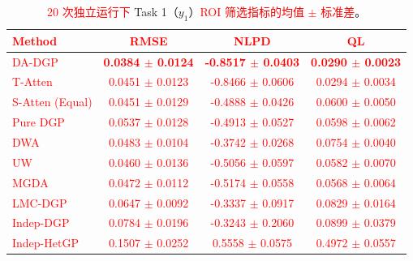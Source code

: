 \documentclass[11pt]{article}
\begin{document}
\begin{table}[htbp]
	\centering
	\small
	\caption{\textcolor{red}{Mean $\pm$ std} of \textcolor{red}{ROI-filtered metrics} for Task 1 ($y_1$) \textcolor{red}{over 20 independent runs}.}
	\caption*{\textcolor{red}{20 次独立运行下} Task 1（$y_1$）\textcolor{red}{ROI 筛选指标的均值 $\pm$ 标准差}。}
	\label{tab:results_task1}
	\begin{tabular*}{\textwidth}{@{\extracolsep{\fill}}lccc}
		\toprule
		\textbf{\textcolor{red}{Method}} & \textbf{\textcolor{red}{RMSE}} & \textbf{\textcolor{red}{NLPD}} & \textbf{\textcolor{red}{QL}} \\
		\midrule
		\textcolor{red}{DA-DGP} & \textcolor{red}{\textbf{0.0384 $\pm$ 0.0124}} & \textcolor{red}{\textbf{-0.8517 $\pm$ 0.0403}} & \textcolor{red}{\textbf{0.0290 $\pm$ 0.0023}} \\
		\textcolor{red}{T-Atten} & \textcolor{red}{0.0451 $\pm$ 0.0123} & \textcolor{red}{-0.8466 $\pm$ 0.0606} & \textcolor{red}{0.0294 $\pm$ 0.0034} \\
		\textcolor{red}{S-Atten (Equal)} & \textcolor{red}{0.0451 $\pm$ 0.0129} & \textcolor{red}{-0.4888 $\pm$ 0.0426} & \textcolor{red}{0.0600 $\pm$ 0.0050} \\
		\textcolor{red}{Pure DGP} & \textcolor{red}{0.0537 $\pm$ 0.0128} & \textcolor{red}{-0.4913 $\pm$ 0.0527} & \textcolor{red}{0.0598 $\pm$ 0.0062} \\
		\textcolor{red}{DWA} & \textcolor{red}{0.0483 $\pm$ 0.0104} & \textcolor{red}{-0.3742 $\pm$ 0.0268} & \textcolor{red}{0.0754 $\pm$ 0.0040} \\
		\textcolor{red}{UW} & \textcolor{red}{0.0460 $\pm$ 0.0136} & \textcolor{red}{-0.5056 $\pm$ 0.0597} & \textcolor{red}{0.0582 $\pm$ 0.0070} \\
		\textcolor{red}{MGDA} & \textcolor{red}{0.0472 $\pm$ 0.0112} & \textcolor{red}{-0.5174 $\pm$ 0.0558} & \textcolor{red}{0.0568 $\pm$ 0.0064} \\
		\textcolor{red}{LMC-DGP} & \textcolor{red}{0.0647 $\pm$ 0.0092} & \textcolor{red}{-0.3337 $\pm$ 0.0917} & \textcolor{red}{0.0829 $\pm$ 0.0164} \\
		\textcolor{red}{Indep-DGP} & \textcolor{red}{0.0784 $\pm$ 0.0196} & \textcolor{red}{-0.3243 $\pm$ 0.2060} & \textcolor{red}{0.0899 $\pm$ 0.0379} \\
		\textcolor{red}{Indep-HetGP} & \textcolor{red}{0.1507 $\pm$ 0.0252} & \textcolor{red}{0.5558 $\pm$ 0.0575} & \textcolor{red}{0.4972 $\pm$ 0.0557} \\
		\bottomrule
	\end{tabular*}
\end{table}
\end{document}
